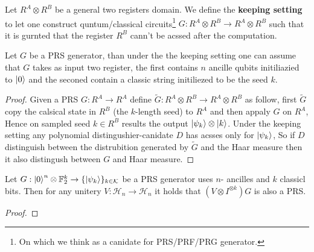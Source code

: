 \documentclass[manuscript,screen,review]{acmart}
\begin{document}
\begin{definition} Let $R^{A}\otimes R^{B}$ be a general
  two registers domain. We define the \textbf{keeping setting} to let one
  construct quntum/classical circuits\footnote{On which we think as a canidate
  for PRS/PRF/PRG generator.} $G : R^{A}\otimes R^{B} \rightarrow R^{A} \otimes
  R^{B}$ such that it is gurnted that the register $R^{B}$ cann't be acssed
  after the computation.
\end{definition}

\begin{claim}
  Let $G$ be a PRS generator, than under the the keeping setting one can assume
  that $G$ takes as input two register, the first contains $n$ ancille qubits
  initiliazied to $\ket{0}$ and the seconed contain a classic string initiliezed
  to be the seed $k$.
\end{claim}

\begin{proof}
  Given a PRS $G : R^{A} \rightarrow R^{A}$ define $\tilde{G} : R^{A} \otimes
  R^{B} \rightarrow R^{A} \otimes R^{B}$ as follow, first $\tilde{G}$ copy the
  calsical state in $R^{B}$ (the $k$-length seed) to $R^{A}$ and then appaly $G$
  on $R^{A}$, Hence on sampled seed $k \in R^{B}$ results the output $
  \ket{\psi_{k}}\otimes\ket{k}$. Under the keeping setting any polynomial
  distingushier-canidate $D$ has acsses only for $\ket{\psi_{k}}$, So if $D$
  distinguish between the distrubition generated by $\tilde{G}$ and the Haar
  measure then it also distingush between $G$ and Haar measure.
\end{proof}

\begin{claim}
  Let $G : \ket{0}^{n} \otimes \mathbb{F}_{2}^{k} \rightarrow \{ \ket{\psi_{k}}
  \}_{k \in \mathcal{K}}$ be a PRS generator uses $n$- ancilles and $k$ classicl
  bits. Then for any unitery $V: \mathcal{H}_{n} \rightarrow \mathcal{H}_{n}$ it
  holds that $(V \otimes I^{\otimes k} ) G$ is also a PRS.
\end{claim}
\begin{proof}

\end{proof}
\end{document}
